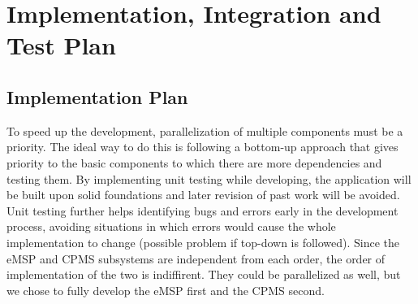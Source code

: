 \documentclass[table, 12pt]{article}
\begin{document}
\section{Implementation, Integration and Test Plan}
\subsection{Implementation Plan}
To speed up the development, parallelization of multiple components must be a priority. The ideal way to do this is following a bottom-up approach that gives priority to the basic components to which there are more dependencies and testing them.
By implementing unit testing while developing, the application will be built upon solid foundations and later revision of past work will be avoided. Unit testing further helps identifying bugs and errors early in the development process, avoiding situations in which errors would
cause the whole implementation to change (possible problem if top-down is followed). Since the eMSP and CPMS subsystems are independent from each order, the order of implementation of the two is indiffirent. They could be parallelized as well, but we chose to fully develop the eMSP first and the CPMS second.
\end{document}
